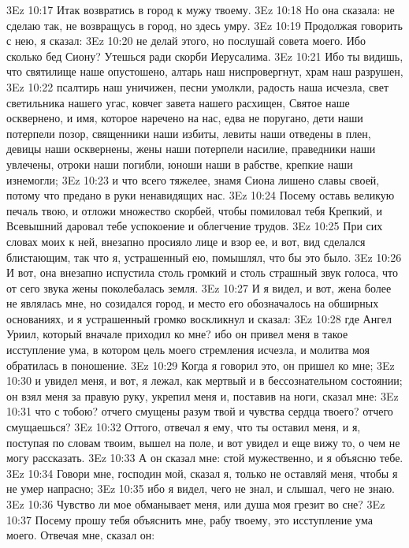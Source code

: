 \vs 3Ez 10:17 Итак возвратись в город к мужу твоему.
\vs 3Ez 10:18 Но она сказала: не сделаю так, не возвращусь в город, но здесь умру.
\vs 3Ez 10:19 Продолжая говорить с нею, я сказал:
\vs 3Ez 10:20 не делай этого, но послушай совета моего. Ибо сколько бед Сиону? Утешься ради скорби Иерусалима.
\vs 3Ez 10:21 Ибо ты видишь, что святилище наше опустошено, алтарь наш ниспровергнут, храм наш разрушен,
\vs 3Ez 10:22 псалтирь наш уничижен, песни умолкли, радость наша исчезла, свет светильника нашего угас, ковчег завета нашего расхищен, Святое наше осквернено, и имя, которое наречено на нас, едва не поругано, дети наши потерпели позор, священники наши избиты, левиты наши отведены в плен, девицы наши осквернены, жены наши потерпели насилие, праведники наши увлечены, отроки наши погибли, юноши наши в рабстве, крепкие наши изнемогли;
\vs 3Ez 10:23 и что всего тяжелее, знамя Сиона лишено славы своей, потому что предано в руки ненавидящих нас.
\vs 3Ez 10:24 Посему оставь великую печаль твою, и отложи множество скорбей, чтобы помиловал тебя Крепкий, и Всевышний даровал тебе успокоение и облегчение трудов.
\vs 3Ez 10:25 При сих словах моих к ней, внезапно просияло лице и взор ее, и вот, вид сделался блистающим, так что я, устрашенный ею, помышлял, что бы это было.
\vs 3Ez 10:26 И вот, она внезапно испустила столь громкий и столь страшный звук голоса, что от сего звука жены поколебалась земля.
\vs 3Ez 10:27 И я видел, и вот, жена более не являлась мне, но созидался город, и место его обозначалось на обширных основаниях, и я устрашенный громко воскликнул и сказал:
\vs 3Ez 10:28 где Ангел Уриил, который вначале приходил ко мне? ибо он привел меня в такое исступление ума, в котором цель моего стремления исчезла, и молитва моя обратилась в поношение.
\vs 3Ez 10:29 Когда я говорил это, он пришел ко мне;
\vs 3Ez 10:30 и увидел меня, и вот, я лежал, как мертвый и в бессознательном состоянии; он взял меня за правую руку, укрепил меня и, поставив на ноги, сказал мне:
\vs 3Ez 10:31 что с тобою? отчего смущены разум твой и чувства сердца твоего? отчего смущаешься?
\vs 3Ez 10:32 Оттого, отвечал я ему, что ты оставил меня, и я, поступая по словам твоим, вышел на поле, и вот увидел и еще вижу то, о чем не могу рассказать.
\vs 3Ez 10:33 А он сказал мне: стой мужественно, и я объясню тебе.
\vs 3Ez 10:34 Говори мне, господин мой, сказал я, только не оставляй меня, чтобы я не умер напрасно;
\vs 3Ez 10:35 ибо я видел, чего не знал, и слышал, чего не знаю.
\vs 3Ez 10:36 Чувство ли мое обманывает меня, или душа моя грезит во сне?
\vs 3Ez 10:37 Посему прошу тебя объяснить мне, рабу твоему, это исступление ума моего. Отвечая мне, сказал он:
